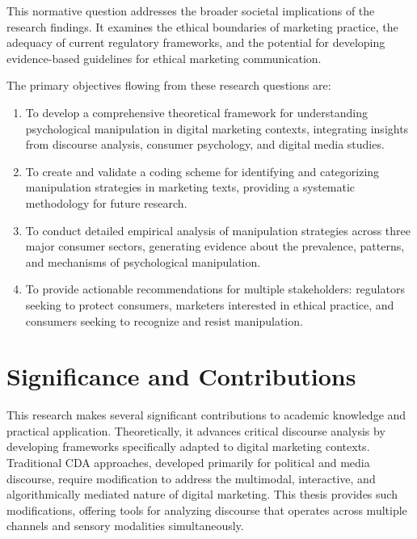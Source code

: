 This normative question addresses the broader societal implications of the research findings. It examines the ethical boundaries of marketing practice, the adequacy of current regulatory frameworks, and the potential for developing evidence-based guidelines for ethical marketing communication.

The primary objectives flowing from these research questions are:

\begin{enumerate}
\item To develop a comprehensive theoretical framework for understanding psychological manipulation in digital marketing contexts, integrating insights from discourse analysis, consumer psychology, and digital media studies.

\item To create and validate a coding scheme for identifying and categorizing manipulation strategies in marketing texts, providing a systematic methodology for future research.

\item To conduct detailed empirical analysis of manipulation strategies across three major consumer sectors, generating evidence about the prevalence, patterns, and mechanisms of psychological manipulation.

\item To provide actionable recommendations for multiple stakeholders: regulators seeking to protect consumers, marketers interested in ethical practice, and consumers seeking to recognize and resist manipulation.
\end{enumerate}

\section{Significance and Contributions}
\label{sec:significance}

This research makes several significant contributions to academic knowledge and practical application. Theoretically, it advances critical discourse analysis by developing frameworks specifically adapted to digital marketing contexts. Traditional CDA approaches, developed primarily for political and media discourse, require modification to address the multimodal, interactive, and algorithmically mediated nature of digital marketing. This thesis provides such modifications, offering tools for analyzing discourse that operates across multiple channels and sensory modalities simultaneously.

